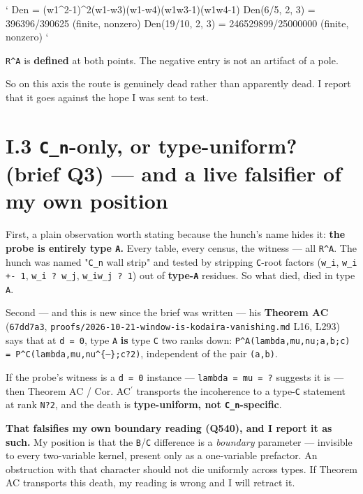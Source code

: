 \documentclass[11pt,a4paper]{article}
\begin{document}
   \mbox{\texttt{}}`
   Den = (w1\textasciicircum{}2-1)\textasciicircum{}2(w1-w3)(w1-w4)(w1w3-1)(w1w4-1) Den(6/5, 2, 3)   = 396396/390625        (finite, nonzero) Den(19/10, 2, 3) = 246529899/25000000   (finite, nonzero)
   \mbox{\texttt{}}`

   \mbox{\texttt{R\textasciicircum{}A}} is \textbf{defined} at both points. The negative entry is not an artifact of a pole.

So on this axis the route is genuinely dead rather than apparently dead. I report that it goes against the hope I was sent to test.

\section*{I.3 \mbox{\texttt{C\_n}}-only, or type-uniform? (brief Q3) --- and a live falsifier of my own position}

First, a plain observation worth stating because the hunch's name hides it: \textbf{the probe is entirely type \mbox{\texttt{A}}.} Every table, every census, the witness --- all \mbox{\texttt{R\textasciicircum{}A}}. The hunch was named "\mbox{\texttt{C\_n}} wall strip" and tested by stripping \mbox{\texttt{C}}-root factors (\mbox{\texttt{w\_i}}, \mbox{\texttt{w\_i +- 1}}, \mbox{\texttt{w\_i ? w\_j}}, \mbox{\texttt{w\_iw\_j ? 1}}) out of \textbf{type-\mbox{\texttt{A}}} residues. So what died, died in type \mbox{\texttt{A}}.

Second --- and this is new since the brief was written --- his \textbf{Theorem AC} (\mbox{\texttt{67dd7a3}}, \mbox{\texttt{proofs/2026-10-21-window-is-kodaira-vanishing.md}} L16, L293) says that at \mbox{\texttt{d = 0}}, type \mbox{\texttt{A}} \textbf{is} type \mbox{\texttt{C}} two ranks down: \mbox{\texttt{P\textasciicircum{}A(lambda,mu,nu;a,b;c) = P\textasciicircum{}C(lambda,mu,nu\textasciicircum{}\{--\};c?2)}}, independent of the pair \mbox{\texttt{(a,b)}}.

If the probe's witness is a \mbox{\texttt{d = 0}} instance --- \mbox{\texttt{lambda = mu = ?}} suggests it is --- then Theorem AC / Cor. AC$^{\prime}$ transports the incoherence to a type-\mbox{\texttt{C}} statement at rank \mbox{\texttt{N?2}}, and the death is \textbf{type-uniform, not \mbox{\texttt{C\_n}}-specific}.

\textbf{That falsifies my own boundary reading (Q540), and I report it as such.} My position is that the \mbox{\texttt{B}}/\mbox{\texttt{C}} difference is a \emph{boundary} parameter --- invisible to every two-variable kernel, present only as a one-variable prefactor. An obstruction with that character should not die uniformly across types. If Theorem AC transports this death, my reading is wrong and I will retract it.
\end{document}
